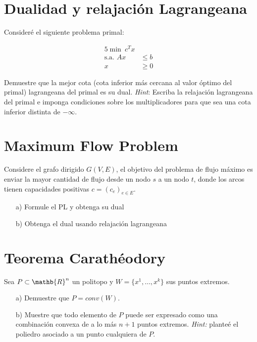 \documentclass[10pt]{article}
\theoremstyle{plain}
\theoremstyle{definition}
\begin{document}
\section{Dualidad y relajación Lagrangeana}
Consideré el siguiente problema primal:

\begin{center}
\begin{alignat*}{5}
\min\  c^{T}x\\
\text{s.a. }  Ax&\leq b\\
x&\geq 0
\end{alignat*}
\end{center}
Demuestre que la mejor cota (cota inferior más cercana al valor óptimo del primal) lagrangeana del primal es su dual. \textit{Hint}: Escriba la relajación lagrangeana del primal e imponga condiciones sobre los multiplicadores para que sea una cota inferior distinta de $-\infty$.

\section{Maximum Flow Problem}

Considere el grafo dirigido $G(V,E)$, el objetivo del problema de flujo máximo es enviar la mayor cantidad de flujo desde un nodo $s$ a un nodo $t$, donde los arcos tienen capacidades positivas $c = (c_{e})_{e \in E}$.
\begin{itemize}
    \item[a)] Formule el PL y obtenga su dual
    \item[b)] Obtenga el dual usando relajación lagrangeana
\end{itemize}

\section{Teorema Carathéodory}
Sea $P \subset \mathb{R}^{n}$ un politopo y $W=\{x^{1},\ldots, x^{k}\}$ sus puntos extremos.

\begin{itemize}
    \item[a)] Demuestre que $P=conv(W)$.
    \item[b)] Muestre que todo elemento de $P$ puede ser expresado como una combinación convexa de a lo más $n+1$ puntos extremos. \textit{Hint:} planteé el poliedro asociado a un punto cualquiera de $P$.
\end{itemize}
\end{document}
